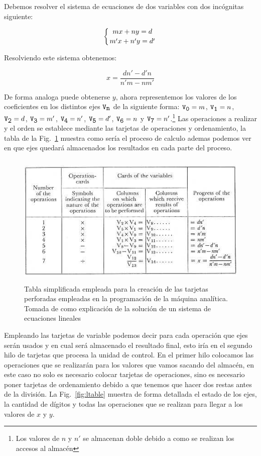 \documentclass[runningheads,a4paper]{llncs}
\begin{document}
Debemos resolver el sistema de ecuaciones de dos variables con dos incógnitas siguiente:

\begin{equation}
	\left\{
		mx + ny = d \atop
		m'x + n'y = d'
	\right.
\end{equation} 

Resolviendo este sistema obtenemos:

\begin{equation}
	x = \frac{dn' - d'n}{n'm - nm'}
\end{equation}

De forma analoga puede obtenerse $y$, ahora representemos los valores de los coeficientes en los distintos ejes $\verb*|V|_{\verb*|n|}$ de la siguiente forma: $\verb*|V|_{\verb*|0|} = m$, $\verb*|V|_{\verb*|1|} = n$, $\verb*|V|_{\verb*|2|} = d$, $\verb*|V|_{\verb*|3|} = m'$, $\verb*|V|_{\verb*|4|} = n'$, $\verb*|V|_{\verb*|5|} = d'$, $\verb*|V|_{\verb*|6|} = n$ y $\verb*|V|_{\verb*|7|} = n'$.\footnote{Los valores de $n$ y $n'$ se almacenan doble debido a como se realizan los accesos al almacén} Las operaciones a realizar y el orden se establece mediante las
tarjetas de operaciones y ordenamiento, la tabla de la Fig.~\ref{fig:stable} muestra como sería el proceso de calculo
ademas podemos ver en que ejes quedará almacenados los resultados en cada parte del proceso.

\begin{figure}
	\centering
	\includegraphics[height=6.4cm]{imgs/stable}
	\caption{Tabla simplificada empleada para la creación de las tarjetas perforadas empleadas en la programación de la máquina analítica. Tomada de \cite{lovelace} como explicación de la solución de un sistema de ecuaciones lineales}
	\label{fig:stable}
\end{figure}

Empleando las tarjetas de variable podemos decir para cada operación que ejes serán usados y en cual será almacenado el resultado final, esto iría en el segundo hilo de tarjetas que procesa la unidad de control. En el primer hilo colocamos 
las operaciones que se realizarán para los valores que vamos sacando del almacén, en este caso no solo es necesario colocar tarjetas de operaciones, sino es necesario poner tarjetas de ordenamiento debido a que tenemos que hacer dos restas antes de la división. La Fig.~\ref{fig:ltable} muestra de forma detallada el estado de los ejes, la cantidad 
de dígitos y todas las operaciones que se realizan para llegar a los valores de $x$ y $y$.
\end{document}
